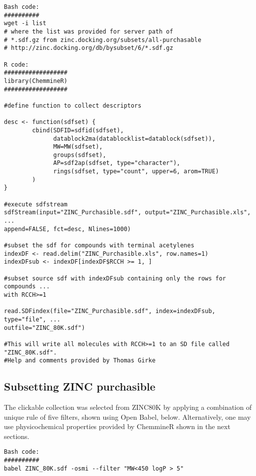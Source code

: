 \begin{verbatim}
Bash code:
##########
wget -i list  
# where the list was provided for server path of 
# *.sdf.gz from zinc.docking.org/subsets/all-purchasable
# http://zinc.docking.org/db/bysubset/6/*.sdf.gz

R code:
##################
library(ChemmineR)
##################

#define function to collect descriptors

desc <- function(sdfset) {
        cbind(SDFID=sdfid(sdfset), 
              datablock2ma(datablocklist=datablock(sdfset)), 
              MW=MW(sdfset), 
              groups(sdfset), 
              AP=sdf2ap(sdfset, type="character"),
              rings(sdfset, type="count", upper=6, arom=TRUE)
        )
}

#execute sdfstream
sdfStream(input="ZINC_Purchasible.sdf", output="ZINC_Purchasible.xls", ...
append=FALSE, fct=desc, Nlines=1000)

#subset the sdf for compounds with terminal acetylenes
indexDF <- read.delim("ZINC_Purchasible.xls", row.names=1)
indexDFsub <- indexDF[indexDF$RCCH >= 1, ]

#subset source sdf with indexDFsub containing only the rows for compounds ...
with RCCH>=1

read.SDFindex(file="ZINC_Purchasible.sdf", index=indexDFsub, type="file", ...
outfile="ZINC_80K.sdf")

#This will write all molecules with RCCH>=1 to an SD file called "ZINC_80K.sdf".
#Help and comments provided by Thomas Girke
\end{verbatim}
\clearpage


\subsection{Subsetting ZINC purchasible}

The clickable collection was selected from ZINC80K by applying a combination of unique rule of five filters, shown using Open Babel, below. Alternatively, one may use physicochemical properties provided by ChemmineR shown in the next sections.

\begin{verbatim}
Bash code:
##########
babel ZINC_80K.sdf -osmi --filter "MW<450 logP > 5"
\end{verbatim}


